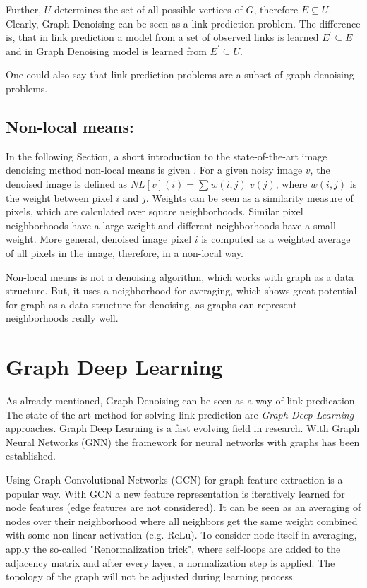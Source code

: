 Further, $U$ determines the set of all possible vertices of $G$, therefore $E \subseteq U$.
Clearly, Graph Denoising can be seen as a link prediction problem.
The difference is, that in link prediction a model from a set of observed links is learned
$E^{\prime} \subseteq E$ and in Graph Denoising model is learned from 
$E^{\prime} \subseteq U$. 

\begin{tcolorbox}[colback=red!5!white,colframe=red!75!black]
    One could also say that link prediction problems are a subset of graph denoising problems.
\end{tcolorbox}

\subsection{Non-local means:}
In the following Section, a short introduction to the 
state-of-the-art image denoising method non-local means is given \cite{noneLocalMean}.
For a given noisy image $v$, the denoised image is defined as $NL[v](i) = \sum{w(i,j) \; v(j)}$,
where $w(i,j)$ is the weight between pixel $i$ and $j$. 
Weights can be seen as a similarity measure of pixels, which are calculated over square neighborhoods.
Similar pixel neighborhoods have a large weight and different neighborhoods have a small weight.
More general, denoised image pixel $i$ is computed as a weighted average of all pixels in the 
image, therefore, in a non-local way.

Non-local means is not a denoising algorithm, which works with graph as a data structure.
But, it uses a neighborhood for averaging, which shows great potential for graph
as a data structure for denoising, as graphs can represent neighborhoods really well.


\section{Graph Deep Learning}
\label{sec:graph_depp_learning}
As already mentioned, Graph Denoising can be seen as a way of link predication. 
The state-of-the-art method for solving link prediction are \textit{Graph Deep Learning} approaches.
Graph Deep Learning is a fast evolving field in research. With Graph Neural Networks (GNN) \cite{GNN} the framework
for neural networks with graphs has been established. 

Using Graph Convolutional Networks (GCN) \cite{GCN} for graph feature extraction is a popular way. 
With GCN a new feature representation is iteratively learned for node features (edge features are not considered).
It can be seen as an averaging of nodes over their neighborhood where all neighbors get the same weight combined with some non-linear activation (e.g. ReLu). 
To consider node itself in averaging, \cite{GCN} apply the so-called "Renormalization trick", where self-loops are added to the 
adjacency matrix and after every layer, a normalization step is applied. 
The topology of the graph will not be adjusted during learning process.

